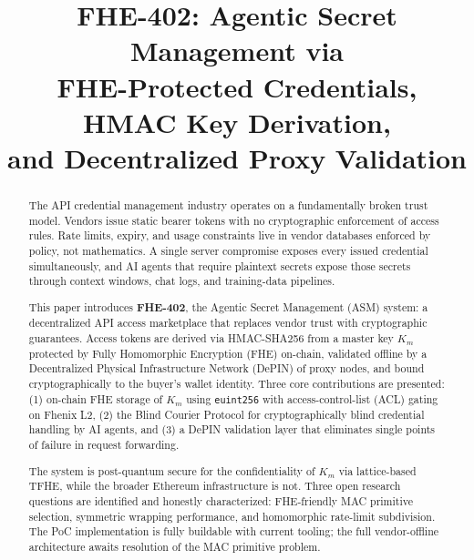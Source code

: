 \documentclass[conference]{IEEEtran}
\begin{document}
\title{FHE-402: Agentic Secret Management via\\
FHE-Protected Credentials, HMAC Key Derivation,\\
and Decentralized Proxy Validation}

\author{
}

\maketitle

\begin{abstract}
The API credential management industry operates on a fundamentally broken trust model.
Vendors issue static bearer tokens with no cryptographic enforcement of access rules.
Rate limits, expiry, and usage constraints live in vendor databases enforced by policy,
not mathematics. A single server compromise exposes every issued credential simultaneously,
and AI agents that require plaintext secrets expose those secrets through context windows,
chat logs, and training-data pipelines.

This paper introduces \textbf{FHE-402}, the Agentic Secret Management (ASM) system: a
decentralized API access marketplace that replaces vendor trust with cryptographic guarantees.
Access tokens are derived via HMAC-SHA256 from a master key $K_m$ protected by Fully
Homomorphic Encryption (FHE) on-chain, validated offline by a Decentralized Physical
Infrastructure Network (DePIN) of proxy nodes, and bound cryptographically to the buyer's
wallet identity. Three core contributions are presented: (1) on-chain FHE storage of
$K_m$ using \texttt{euint256} with access-control-list (ACL) gating on Fhenix L2, (2) the
Blind Courier Protocol for cryptographically blind credential handling by AI agents, and (3)
a DePIN validation layer that eliminates single points of failure in request forwarding.

The system is post-quantum secure for the confidentiality of $K_m$ via lattice-based
TFHE, while the broader Ethereum infrastructure is not. Three open research questions are
identified and honestly characterized: FHE-friendly MAC primitive selection, symmetric
wrapping performance, and homomorphic rate-limit subdivision. The PoC implementation is
fully buildable with current tooling; the full vendor-offline architecture awaits resolution
of the MAC primitive problem.
\end{abstract}
\end{document}
